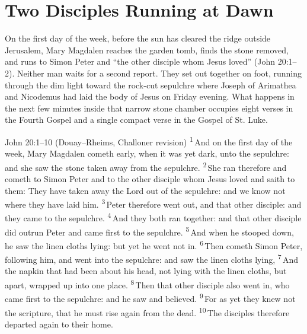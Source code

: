 \section{Two Disciples Running at Dawn}
\label{sec:dawn}

On the first day of the week, before the sun has cleared the ridge outside Jerusalem, Mary Magdalen reaches the garden tomb, finds the stone removed, and runs to Simon Peter and ``the other disciple whom Jesus loved'' (John 20:1--2). Neither man waits for a second report. They set out together on foot, running through the dim light toward the rock-cut sepulchre where Joseph of Arimathea and Nicodemus had laid the body of Jesus on Friday evening. What happens in the next few minutes inside that narrow stone chamber occupies eight verses in the Fourth Gospel and a single compact verse in the Gospel of St. Luke.

\begin{massbox}{John 20:1--10 (Douay--Rheims, Challoner revision)}
\textsuperscript{1}\,And on the first day of the week, Mary Magdalen cometh early, when it was yet dark, unto the sepulchre: and she saw the stone taken away from the sepulchre.
\textsuperscript{2}\,She ran therefore and cometh to Simon Peter and to the other disciple whom Jesus loved and saith to them: They have taken away the Lord out of the sepulchre: and we know not where they have laid him.
\textsuperscript{3}\,Peter therefore went out, and that other disciple: and they came to the sepulchre.
\textsuperscript{4}\,And they both ran together: and that other disciple did outrun Peter and came first to the sepulchre.
\textsuperscript{5}\,And when he stooped down, he saw the linen cloths lying: but yet he went not in.
\textsuperscript{6}\,Then cometh Simon Peter, following him, and went into the sepulchre: and saw the linen cloths lying,
\textsuperscript{7}\,And the napkin that had been about his head, not lying with the linen cloths, but apart, wrapped up into one place.
\textsuperscript{8}\,Then that other disciple also went in, who came first to the sepulchre: and he saw and believed.
\textsuperscript{9}\,For as yet they knew not the scripture, that he must rise again from the dead.
\textsuperscript{10}\,The disciples therefore departed again to their home.
\end{massbox}

